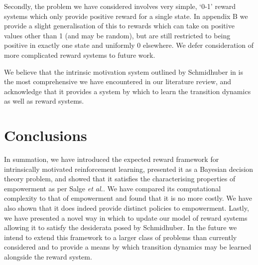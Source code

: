 \documentclass{article}
\begin{document}
Secondly, the problem we have considered involves very simple, `0-1' reward systems which only provide positive reward for a single state. In appendix B we provide a slight generalisation of this to rewards which can take on positive values other than 1 (and may be random), but are still restricted to being positive in exactly one state and uniformly 0 elsewhere. We defer consideration of more complicated reward systems to future work. 

We believe that the intrinsic motivation system outlined by Schmidhuber in \cite{schmidhuber2010formal} is the most comprehensive we have encountered in our literature review, and acknowledge that it provides a system by which to learn the transition dynamics as well as reward systems.

\section{Conclusions}
In summation, we have introduced the expected reward framework for intrinsically motivated reinforcement learning, presented it as a Bayesian decision theory problem, and showed that it satisfies the characterising properties of empowerment as per Salge \textit{et al.}. We have compared its computational complexity to that of empowerment and found that it is no more costly. We have also shown that it does indeed provide distinct policies to empowerment. Lastly, we have presented a novel way in which to update our model of reward systems allowing it to satisfy the desiderata posed by Schmidhuber. In the future we intend to extend this framework to a larger class of problems than currently considered and to  provide a means by which transition dynamics may be learned alongside the reward system.
\newpage
\nocite{*}


\newpage
\end{document}
